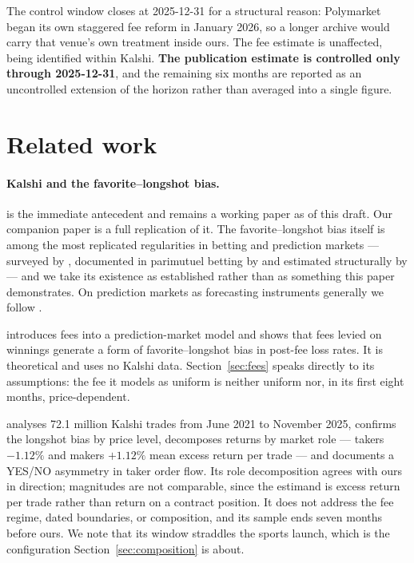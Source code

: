 \documentclass[preprint,12pt,authoryear]{elsarticle}
\begin{document}
The control window closes at 2025-12-31 for a structural reason: Polymarket
began its own staggered fee reform in January 2026, so a longer archive would
carry that venue's own treatment inside ours. The fee estimate is unaffected,
being identified within Kalshi. \textbf{The publication estimate is controlled
only through 2025-12-31}, and the remaining six months are reported as an
uncontrolled extension of the horizon rather than averaged into a single figure.

\section{Related work}\label{sec:related}

\paragraph{Kalshi and the favorite--longshot bias.} \citet{burgi2026} is the
immediate antecedent and remains a working paper as of this draft. Our companion
paper is a full replication of it. The favorite--longshot bias itself is among
the most replicated regularities in betting and prediction markets --- surveyed
by \citet{ottaviani2008}, documented in parimutuel betting by
\citet{thaler1988} and estimated structurally by \citet{snowberg2010} --- and we
take its existence as established rather than as something this paper
demonstrates. On prediction markets as forecasting instruments generally we
follow \citet{wolfers2004}.

\citet{whelan2023} introduces fees into a prediction-market model and shows that
fees levied on winnings generate a form of favorite--longshot bias in post-fee
loss rates. It is theoretical and uses no Kalshi data. Section~\ref{sec:fees}
speaks directly to its assumptions: the fee it models as uniform is neither
uniform nor, in its first eight months, price-dependent.

\citet{becker2026} analyses 72.1 million Kalshi trades from June 2021 to
November 2025, confirms the longshot bias by price level, decomposes returns by
market role --- takers $-1.12\%$ and makers $+1.12\%$ mean excess return per
trade --- and documents a YES/NO asymmetry in taker order flow. Its role
decomposition agrees with ours in direction; magnitudes are not comparable,
since the estimand is excess return per trade rather than return on a contract
position. It does not address the fee regime, dated boundaries, or composition,
and its sample ends seven months before ours. We note that its window straddles
the sports launch, which is the configuration Section~\ref{sec:composition} is
about.
\end{document}
